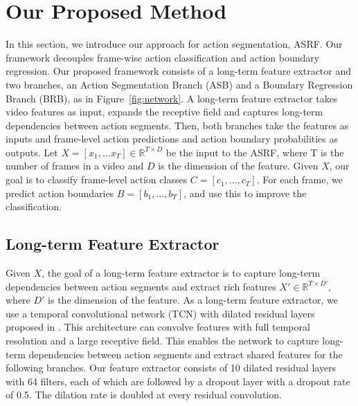 \documentclass[10pt,twocolumn,letterpaper]{article}
\begin{document}
\section{Our Proposed Method}

In this section, we introduce our approach for action segmentation, ASRF.
Our framework decouples frame-wise action classification and action boundary regression.
Our proposed framework consists of a long-term feature extractor and two branches, an Action Segmentation Branch (ASB) and a Boundary Regression Branch (BRB), as in Figure~\ref{fig:network}.
A long-term feature extractor takes video features as input, expands the receptive field and captures long-term dependencies between action segments.
Then, both branches take the features as inputs and frame-level action predictions and action boundary probabilities as outputs. 
Let $X = [x_1, ... x_T ] \in \mathbb{R}^{T \times D}$ be the input to the ASRF, where T is the number of frames in a video and $D$ is the dimension of the feature. 
Given $X$, our goal is to classify frame-level action classes $C = [c_1, ..., c_T]$.
For each frame, we predict action boundaries $B = [b_1, ..., b_T]$, and use this to improve the classification. 





\subsection{Long-term Feature Extractor}
\label{extractor}
Given $X$, the goal of a long-term feature extractor is to capture long-term dependencies between action segments and extract rich features $X' \in \mathbb{R}^{T \times D'}$, where $D'$ is the dimension of the feature.
As a long-term feature extractor, we use a temporal convolutional network (TCN) with dilated residual layers proposed in \cite{mstcn}.
This architecture can convolve features with full temporal resolution and a large receptive field.
This enables the network to capture long-term dependencies between action segments and extract shared features for the following branches. 
Our feature extractor consists of 10 dilated residual layers with 64 filters, each of which are followed by a dropout layer with a dropout rate of 0.5.
The dilation rate is doubled at every residual convolution.
\end{document}

